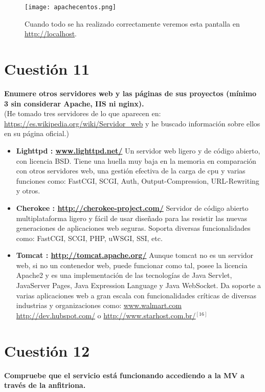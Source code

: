 \documentclass[a4paper, 11pt]{article} %
\begin{document}
\begin{figure}[h]
\centering 
\texttt{[image: apachecentos.png]} 
\caption{Cuando todo se ha realizado correctamente veremos esta pantalla en \url{http://localhost}.} 
\vspace{-0.5cm}
\label{contexto:figura} 
\end{figure}

\pagebreak

\section{Cuestión 11}
\textbf{Enumere otros servidores web y las páginas de sus proyectos (mínimo 3 sin considerar Apache, IIS ni nginx).}\\
(He tomado tres servidores de lo que aparecen en: \url{https://es.wikipedia.org/wiki/Servidor_web} y he buscado información sobre ellos en su página oficial.)
\begin{itemize}
\item \textbf{Lighttpd : \url{www.lighttpd.net/}} Un servidor web ligero y de código abierto, con licencia BSD. Tiene una huella muy baja en la memoria en comparación con otros servidores web, una gestión efectiva de la carga de cpu y varias funciones como: FastCGI, SCGI, Auth, Output-Compression, URL-Rewriting y otros.
\item \textbf{Cherokee : \url{http://cherokee-project.com/}} Servidor de código abierto multiplataforma ligero y fácil de usar diseñado para las resistir las nuevas generaciones de aplicaciones web seguras. Soporta diversas funcionalidades como: FastCGI, SCGI, PHP, uWSGI, SSI, etc.
\item \textbf{Tomcat : \url{http://tomcat.apache.org/}} Aunque tomcat no es un servidor web, si no un contenedor web, puede funcionar como tal, posee la  licencia Apache2 y es una implementación de las tecnologías de Java Servlet, JavaServer Pages, Java Expression Language y Java WebSocket. Da soporte a varias aplicaciones web a gran escala con funcionalidades críticas de diversas industrias y organizaciones como: \url{www.walmart.com} \url{http://dev.hubspot.com/} o \url{http://www.starhost.com.br/}$^{[16]}$
\end{itemize}

\pagebreak

\section{Cuestión 12}
\textbf{Compruebe que el servicio está funcionando accediendo a la MV a través de la anfitriona.}\\
\end{document}
